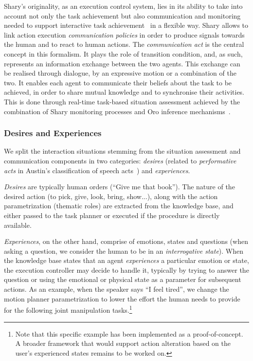 \documentclass[preprint,3p,times]{elsarticle}
\begin{document}
{\sc Shary}'s originality, as an execution control system, lies in its ability
to take into account not only the task achievement but also communication and
monitoring needed to support interactive task
achievement~\cite{Rich1997,Sidner2005} in a flexible way. {\sc Shary} allows to
link action execution \emph{communication policies} in order to produce signals
towards the human and to react to human actions. The \emph{communication act} is
the central concept in this formalism. It plays the role of transition
condition, and, as such, represents an information exchange between the two
agents. This exchange can be realised through dialogue, by an expressive motion
or a combination of the two. It enables each agent to communicate their beliefs
about the task to be achieved, in order to share mutual knowledge and to
synchronise their activities.  This is done through real-time task-based
situation assessment achieved by the combination of {\sc Shary} monitoring
processes and {\sc Oro} inference mechanisms~\cite{fiore2014}.


\subsubsection{Desires and Experiences}

We split the interaction situations stemming from the situation assessment and
communication components in two categories: \emph{desires} (related to
\emph{performative acts} in Austin's classification of speech
acts~\cite{Austin1962}) and \emph{experiences}.

\emph{Desires} are typically human orders (``Give me that book''). The nature of
the desired action (to pick, give, look, bring, show...), along with the action
parametrization (thematic roles) are extracted from the knowledge base, and
either passed to the task planner or executed if the procedure is directly
available.

\emph{Experiences}, on the other hand, comprise of emotions, states and
questions (when asking a question, we consider the human to be in an
\emph{interrogative state}). When the knowledge base states that an agent
\emph{experiences} a particular emotion or state, the execution controller may
decide to handle it, typically by trying to answer the question or using the
emotional or physical state as a parameter for subsequent actions. As an
example, when the speaker says ``I feel tired'', we change the motion planner
parametrization to lower the effort the human needs to provide for the following
joint manipulation tasks.\footnote{Note that this specific example has been
implemented as a proof-of-concept. A broader framework that would support
action alteration based on the user's experienced states remains to be worked on.}
\end{document}
